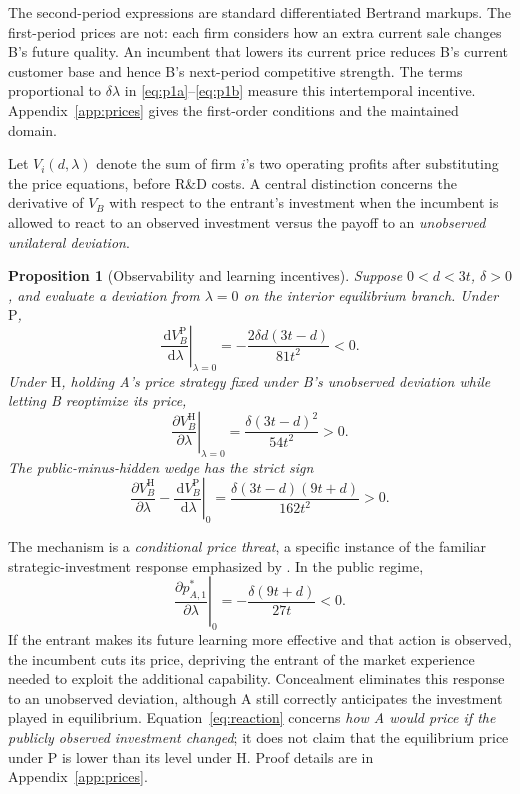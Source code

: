 \documentclass[11pt,a4paper]{article}
\numberwithin{equation}{section}
\newtheorem{proposition}{Proposition}
\theoremstyle{remark}
\newcommand{\PP}{\mathrm{P}}
\newcommand{\HH}{\mathrm{H}}
\newcommand{\dd}{\,\mathrm{d}}
\begin{document}
The second-period expressions are standard differentiated Bertrand markups. The first-period prices are not: each firm considers how an extra current sale changes B's future quality. An incumbent that lowers its current price reduces B's current customer base and hence B's next-period competitive strength. The terms proportional to $\delta\lambda$ in \eqref{eq:p1a}--\eqref{eq:p1b} measure this intertemporal incentive. Appendix~\ref{app:prices} gives the first-order conditions and the maintained domain.

Let $V_i(d,\lambda)$ denote the sum of firm $i$'s two operating profits after substituting the price equations, before R\&D costs. A central distinction concerns the derivative of $V_B$ with respect to the entrant's investment when the incumbent is allowed to react to an observed investment versus the payoff to an \emph{unobserved unilateral deviation}.

\begin{proposition}[Observability and learning incentives]\label{prop:incentives}
Suppose $0<d<3t$, $\delta>0$, and evaluate a deviation from $\lambda=0$ on the interior equilibrium branch. Under $\PP$,
\begin{equation}
\left.\frac{\dd V_B^{\PP}}{\dd\lambda}\right|_{\lambda=0}
=-\frac{2\delta d(3t-d)}{81t^2}<0. \label{eq:publicder}
\end{equation}
Under $\HH$, holding A's price strategy fixed under B's unobserved deviation while letting B reoptimize its price,
\begin{equation}
\left.\frac{\partial V_B^{\HH}}{\partial\lambda}\right|_{\lambda=0}
=\frac{\delta(3t-d)^2}{54t^2}>0. \label{eq:hiddender}
\end{equation}
The public-minus-hidden wedge has the strict sign
\begin{equation}
\left.\frac{\partial V_B^{\HH}}{\partial\lambda}
-\frac{\dd V_B^{\PP}}{\dd\lambda}\right|_0
=\frac{\delta(3t-d)(9t+d)}{162t^2}>0. \label{eq:wedge}
\end{equation}
\end{proposition}

The mechanism is a \emph{conditional price threat}, a specific instance of the familiar strategic-investment response emphasized by \citet{FudenbergTirole1984,BulowGeanakoplosKlemperer1985}. In the public regime,
\begin{equation}
\left.\frac{\partial p_{A,1}^*}{\partial\lambda}\right|_0
=-\frac{\delta(9t+d)}{27t}<0.\label{eq:reaction}
\end{equation}
If the entrant makes its future learning more effective and that action is observed, the incumbent cuts its price, depriving the entrant of the market experience needed to exploit the additional capability. Concealment eliminates this response to an unobserved deviation, although A still correctly anticipates the investment played in equilibrium. Equation~\eqref{eq:reaction} concerns \emph{how A would price if the publicly observed investment changed}; it does not claim that the equilibrium price under P is lower than its level under H. Proof details are in Appendix~\ref{app:prices}.
\end{document}
